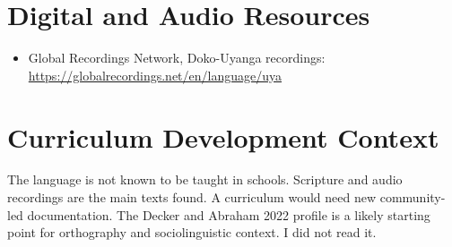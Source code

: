 \documentclass[12pt]{article}
\begin{document}
\section{Digital and Audio Resources}
\begin{itemize}
\item Global Recordings Network, Doko-Uyanga recordings: \url{https://globalrecordings.net/en/language/uya}
\end{itemize}

\section{Curriculum Development Context}
The language is not known to be taught in schools. Scripture and audio recordings are the main texts found. A curriculum would need new community-led documentation. The Decker and Abraham 2022 profile is a likely starting point for orthography and sociolinguistic context. I did not read it.
\end{document}
